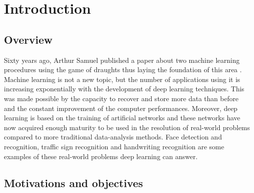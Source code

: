 
\chapter{Introduction} %

\label{Chapter1} %



\section{Overview}

Sixty years ago, Arthur Samuel published a paper about two machine learning procedures using the game of draughts thus laying the foundation of this area  \cite{Samuel}. Machine learning is not a new topic,  but the number of applications using it is increasing exponentially with the development of deep learning techniques. This was made possible by the capacity to recover and store more data than before and the constant improvement of the computer performances. Moreover, deep learning is based on the training of artificial networks and these networks have now acquired enough maturity to be used in the resolution of real-world problems compared to more traditional data-analysis methods. 
Face detection and recognition, traffic sign recognition and handwriting recognition are some examples of these real-world problems deep learning can answer. 





\section{Motivations and objectives}


